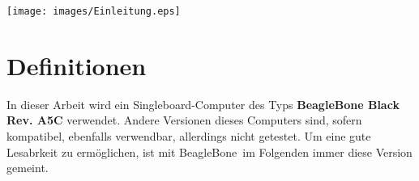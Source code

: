 \vfill

\texttt{[image: images/Einleitung.eps]}

\vfill

\section{Definitionen}
In dieser Arbeit wird ein Singleboard-Computer des Typs \textbf{BeagleBone Black Rev. A5C} verwendet. Andere Versionen dieses Computers sind, sofern kompatibel, ebenfalls verwendbar, allerdings nicht getestet. Um eine gute Lesabrkeit zu ermöglichen, ist mit \glqq BeagleBone\grqq ~im Folgenden immer diese Version gemeint.